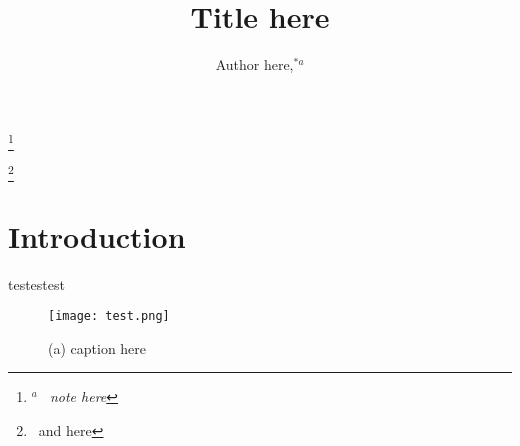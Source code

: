 \documentclass[12pt, a4paper, twocolumn]{article}
\title{Title here}
\author{Author here,\ddag\textit{$^{\ast a}$}}
\date{}
\newcommand\blfootnote[1]{%
  \begingroup
  \renewcommand\thefootnote{}\footnote{#1}%
  \addtocounter{footnote}{-1}%
  \endgroup
}
\begin{document}


\blfootnote{\textit{$^{a}$~ note here}}

\blfootnote{\ddag~and here}

\section{Introduction}
testestest

\begin{figure}[h]
  \centering
    \texttt{[image: test.png]}
    \caption{(a) caption here }
    \label{fig1}
  \end{figure}

\renewcommand\refname{References}

 

\end{document}
